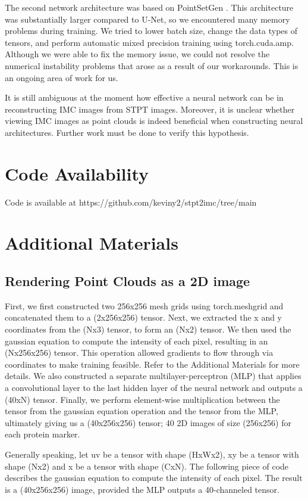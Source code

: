 \documentclass[10pt,twocolumn,letterpaper]{article}
\begin{document}
The second network architecture was based on PointSetGen \cite{fan_2016_a}. This architecture was substantially larger compared to U-Net, so we encountered many memory problems during training. We tried to lower batch size, change the data types of tensors, and perform automatic mixed precision training using torch.cuda.amp. Although we were able to fix the memory issue, we could not resolve the numerical instability problems that arose as a result of our workarounds. This is an ongoing area of work for us.

It is still ambiguous at the moment how effective a neural network can be in reconstructing IMC images from STPT images. Moreover, it is unclear whether viewing IMC images as point clouds is indeed beneficial when constructing neural architectures. Further work must be done to verify this hypothesis.

\section{Code Availability}
Code is available at https://github.com/keviny2/stpt2imc/tree/main


\section{Additional Materials}
\subsection{Rendering Point Clouds as a 2D image}
First, we first constructed two 256x256 mesh grids using torch.meshgrid and concatenated them to a (2x256x256) tensor. Next, we extracted the x and y coordinates from the (Nx3) tensor, to form an (Nx2) tensor. We then used the gaussian equation to compute the intensity of each pixel, resulting in an (Nx256x256) tensor. This operation allowed gradients to flow through via coordinates to make training feasible. Refer to the Additional Materials for more details. We also constructed a separate multilayer-perceptron (MLP) that applies a convolutional layer to the last hidden layer of the neural network and outputs a (40xN) tensor. Finally, we perform element-wise multiplication between the tensor from the gaussian equation operation and the tensor from the MLP, ultimately giving us a (40x256x256) tensor; 40 2D images of size (256x256) for each protein marker. 


Generally speaking, let uv be a tensor with shape (HxWx2), xy be a tensor with shape (Nx2) and x be a tensor with shape (CxN). The following piece of code describes the gaussian equation to compute the intensity of each pixel. The result is a (40x256x256) image, provided the MLP outputs a 40-channeled tensor.
\end{document}
